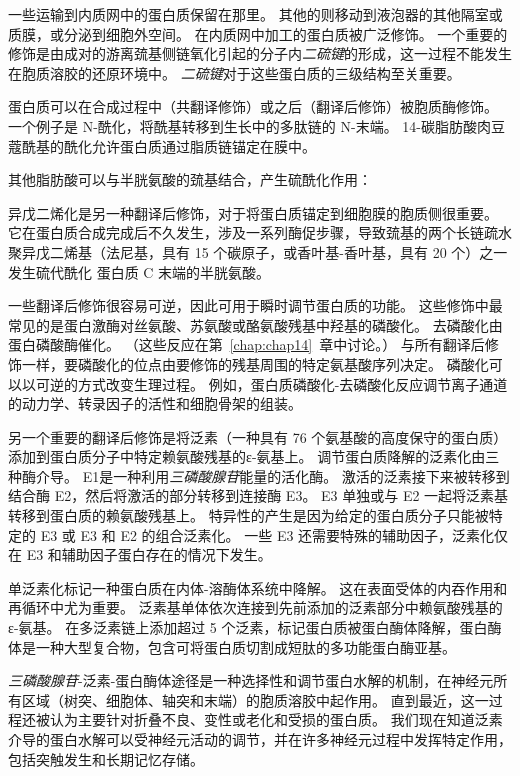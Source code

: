 一些运输到内质网中的蛋白质保留在那里。
其他的则移动到液泡器的其他隔室或质膜，或分泌到细胞外空间。
在内质网中加工的蛋白质被广泛修饰。
一个重要的修饰是由成对的游离巯基侧链氧化引起的分子内\textit{二硫键}的形成，这一过程不能发生在胞质溶胶的还原环境中。
\textit{二硫键}对于这些蛋白质的三级结构至关重要。


蛋白质可以在合成过程中（共翻译修饰）或之后（翻译后修饰）被胞质酶修饰。
一个例子是 N-酰化，将酰基转移到生长中的多肽链的 N-末端。
14-碳脂肪酸肉豆蔻酰基的酰化允许蛋白质通过脂质链锚定在膜中。


其他脂肪酸可以与半胱氨酸的巯基结合，产生硫酰化作用：

异戊二烯化是另一种翻译后修饰，对于将蛋白质锚定到细胞膜的胞质侧很重要。
它在蛋白质合成完成后不久发生，涉及一系列酶促步骤，导致巯基的两个长链疏水聚异戊二烯基（法尼基，具有 15 个碳原子，或香叶基-香叶基，具有 20 个）之一发生硫代酰化 蛋白质 C 末端的半胱氨酸。


一些翻译后修饰很容易可逆，因此可用于瞬时调节蛋白质的功能。
这些修饰中最常见的是蛋白激酶对丝氨酸、苏氨酸或酪氨酸残基中羟基的磷酸化。
去磷酸化由蛋白磷酸酶催化。 （这些反应在第~\ref{chap:chap14}~章中讨论。）
与所有翻译后修饰一样，要磷酸化的位点由要修饰的残基周围的特定氨基酸序列决定。
磷酸化可以以可逆的方式改变生理过程。
例如，蛋白质磷酸化-去磷酸化反应调节离子通道的动力学、转录因子的活性和细胞骨架的组装。


另一个重要的翻译后修饰是将泛素（一种具有 76 个氨基酸的高度保守的蛋白质）添加到蛋白质分子中特定赖氨酸残基的ε-氨基上。
调节蛋白质降解的泛素化由三种酶介导。
E1是一种利用\textit{三磷酸腺苷}能量的活化酶。
激活的泛素接下来被转移到结合酶 E2，然后将激活的部分转移到连接酶 E3。
E3 单独或与 E2 一起将泛素基转移到蛋白质的赖氨酸残基上。
特异性的产生是因为给定的蛋白质分子只能被特定的 E3 或 E3 和 E2 的组合泛素化。
一些 E3 还需要特殊的辅助因子，泛素化仅在 E3 和辅助因子蛋白存在的情况下发生。


单泛素化标记一种蛋白质在内体-溶酶体系统中降解。
这在表面受体的内吞作用和再循环中尤为重要。
泛素基单体依次连接到先前添加的泛素部分中赖氨酸残基的ε-氨基。
在多泛素链上添加超过 5 个泛素，标记蛋白质被蛋白酶体降解，蛋白酶体是一种大型复合物，包含可将蛋白质切割成短肽的多功能蛋白酶亚基。


\textit{三磷酸腺苷}-泛素-蛋白酶体途径是一种选择性和调节蛋白水解的机制，在神经元所有区域（树突、细胞体、轴突和末端）的胞质溶胶中起作用。
直到最近，这一过程还被认为主要针对折叠不良、变性或老化和受损的蛋白质。
我们现在知道泛素介导的蛋白水解可以受神经元活动的调节，并在许多神经元过程中发挥特定作用，包括突触发生和长期记忆存储。


